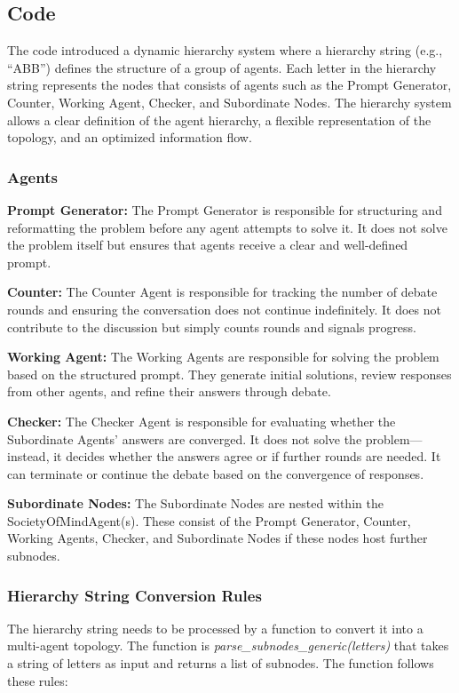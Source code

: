 \subsection{Code}
The code introduced a dynamic hierarchy system where a hierarchy string (e.g., “ABB”) defines the structure of a group of agents. Each letter in the hierarchy string represents the nodes that consists of agents such as the Prompt Generator, Counter, Working Agent, Checker, and Subordinate Nodes. The hierarchy system allows a clear definition of the agent hierarchy, a flexible representation of the topology, and an optimized information flow. 

\subsubsection{Agents}
\textbf{Prompt Generator:} The Prompt Generator is responsible for structuring and reformatting the problem before any agent attempts to solve it. It does not solve the problem itself but ensures that agents receive a clear and well-defined prompt.

\textbf{Counter:} The Counter Agent is responsible for tracking the number of debate rounds and ensuring the conversation does not continue indefinitely. It does not contribute to the discussion but simply counts rounds and signals progress.

\textbf{Working Agent:} The Working Agents are responsible for solving the problem based on the structured prompt. They generate initial solutions, review responses from other agents, and refine their answers through debate.

\textbf{Checker:} The Checker Agent is responsible for evaluating whether the Subordinate Agents' answers are converged. It does not solve the problem—instead, it decides whether the answers agree or if further rounds are needed. It can terminate or continue the debate based on the convergence of responses.

\textbf{Subordinate Nodes:} The Subordinate Nodes are nested within the SocietyOfMindAgent(s). These consist of the Prompt Generator, Counter, Working Agents, Checker, and Subordinate Nodes if these nodes host further subnodes. 

\subsubsection{Hierarchy String Conversion Rules}
The hierarchy string needs to be processed by a function to convert it into a multi-agent topology. The function is \textit{parse\_subnodes\_generic(letters)} that takes a string of letters as input and returns a list of subnodes. The function follows these rules:

